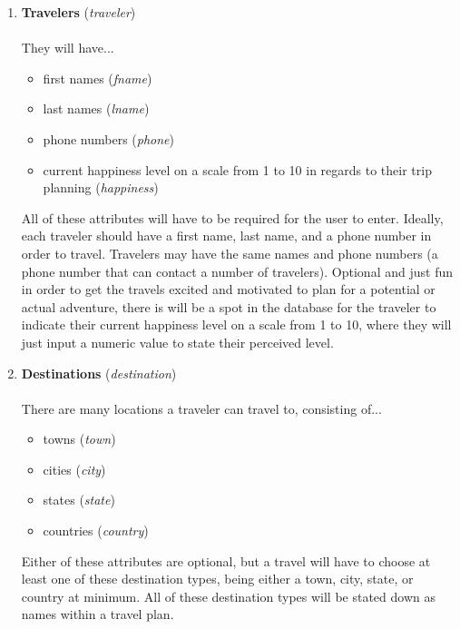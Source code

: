 \documentclass[letterpaper,10pt,onecolumn,compsoc]{IEEEtran}
\begin{document}
\begin{enumerate}

\item 
\textbf{Travelers} (\textit{traveler})
\\ ~ \\ They will have...
\begin{itemize}
	\item first names (\textit{fname})
	\item last names (\textit{lname})
	\item phone numbers (\textit{phone})
	\item current happiness level on a scale from 1 to 10 in regards to their trip planning (\textit{happiness})
\end{itemize}
All of these attributes will have to be required for the user to enter. Ideally, each traveler should have a first name, last name, and a phone number in order to travel. Travelers may have the same names and phone numbers (a phone number that can contact a number of travelers). Optional and just fun in order to get the travels excited and motivated to plan for a potential or actual adventure, there is will be a spot in the database for the traveler to indicate their current happiness level on a scale from 1 to 10, where they will just input a numeric value to state their perceived level.
\\

\item 
\textbf{Destinations} (\textit{destination})
\\ ~ \\ There are many locations a traveler can travel to, consisting of...
\begin{itemize}
	\item towns (\textit{town})
	\item cities (\textit{city})
	\item states (\textit{state})
	\item countries (\textit{country})
\end{itemize}
Either of these attributes are optional, but a travel will have to choose at least one of these destination types, being either a town, city, state, or country at minimum. All of these destination types will be stated down as names within a travel plan.
\\


\end{enumerate}
\end{document}
